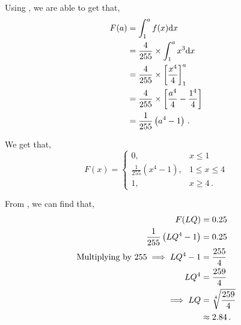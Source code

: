 \begin{subquestions}
\begin{subsubquestions}
\end{subsubquestions}
	

\subquestion

\begin{subsubquestions}
	
\subsubquestion

Using , we are able to get that,
\begin{align}
	F(a) & = \int_{1}^{a} f(x)\mathrm{d}x \nonumber \\
	     & = \frac{4}{255} \times \int_{1}^{a} x^3\mathrm{d}x \nonumber \\
	     & = \frac{4}{255} \times \left[\frac{x^4}{4}\right]^a_1 \nonumber \\
	     & = \frac{4}{255} \times \left[\frac{a^4}{4} - \frac{1^4}{4} \right] \nonumber \\
	     & = \frac{1}{255}\left(a^4 - 1 \right) \,.
\end{align}
	
We get that,
\[ F(x) = \begin{cases} 
	0 , & x\leq 1 \\
	\frac{1}{255}\left(x^4 - 1 \right), & 1 \leq x \leq 4 \\
	1, & x \geq 4 \,.
\end{cases}
\]


\subsubquestion

From , we can find that,
\begin{align}
	F(LQ) & = 0.25 \nonumber \\
	\frac{1}{255}\left(LQ^4 - 1 \right) & = 0.25 \nonumber \\
	\text{Multiplying by 255} \implies LQ^4 - 1 & = \frac{255}{4} \nonumber \\
	LQ^4 & = \frac{259}{4} \nonumber \\
	\implies LQ & = \sqrt[4]{\frac{259}{4}} \nonumber \\
	           & \approx 2.84 \,. 
\end{align}	

\end{subsubquestions}
	
\end{subquestions}

